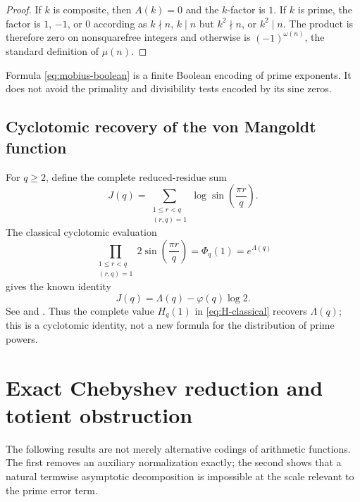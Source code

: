 \documentclass[11pt]{amsart}
\numberwithin{equation}{section}
\theoremstyle{definition}
\theoremstyle{remark}
\begin{document}
\begin{proof}
If \(k\) is composite, then \(A(k)=0\) and the \(k\)-factor is \(1\).
If \(k\) is prime, the factor is \(1\), \(-1\), or \(0\) according as
\(k\nmid n\), \(k\mid n\) but \(k^2\nmid n\), or \(k^2\mid n\).
The product is therefore zero on nonsquarefree integers and otherwise is
\((-1)^{\omega(n)}\), the standard definition of \(\mu(n)\).
\end{proof}

Formula \eqref{eq:mobius-boolean} is a finite Boolean encoding of prime
exponents.  It does not avoid the primality and divisibility tests encoded
by its sine zeros.

\subsection{Cyclotomic recovery of the von Mangoldt function}

For \(q\geq2\), define the complete reduced-residue sum
\begin{equation}\label{eq:J}
 J(q)=\sum_{\substack{1\leq r<q\\(r,q)=1}}
 \log\sin\!\left(\frac{\pi r}{q}\right).
\end{equation}
The classical cyclotomic evaluation
\begin{equation}\label{eq:cyclotomic-Lambda}
 \prod_{\substack{1\leq r<q\\(r,q)=1}}
 2\sin\!\left(\frac{\pi r}{q}\right)
 =\Phi_q(1)=e^{\Lambda(q)}
\end{equation}
gives the known identity
\begin{equation}\label{eq:J-Lambda}
 J(q)=\Lambda(q)-\varphi(q)\log2.
\end{equation}
See \cite[Lemma~2.2]{HerreraMoree2018} and
\cite[Chapters~1--2]{Washington1997}.  Thus the complete value
\(H_q(1)\) in \eqref{eq:H-classical} recovers \(\Lambda(q)\); this is a
cyclotomic identity, not a new formula for the distribution of prime
powers.

\section{Exact Chebyshev reduction and totient obstruction}
\label{sec:chebyshev-obstruction}

The following results are not merely alternative codings of arithmetic
functions.  The first removes an auxiliary normalization exactly; the second
shows that a natural termwise asymptotic decomposition is impossible at the
scale relevant to the prime error term.
\end{document}
